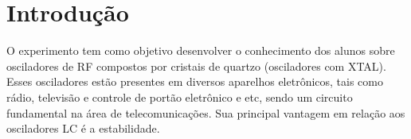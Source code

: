 \newpage

\section{Introdução}
O experimento tem como objetivo desenvolver o conhecimento dos alunos sobre osciladores de RF compostos por cristais de quartzo (osciladores com XTAL). Esses osciladores estão presentes em diversos aparelhos eletrônicos, tais como rádio, televisão e controle de portão eletrônico e etc, sendo um circuito fundamental na área de telecomunicações. Sua principal vantagem em relação aos osciladores LC é a estabilidade.